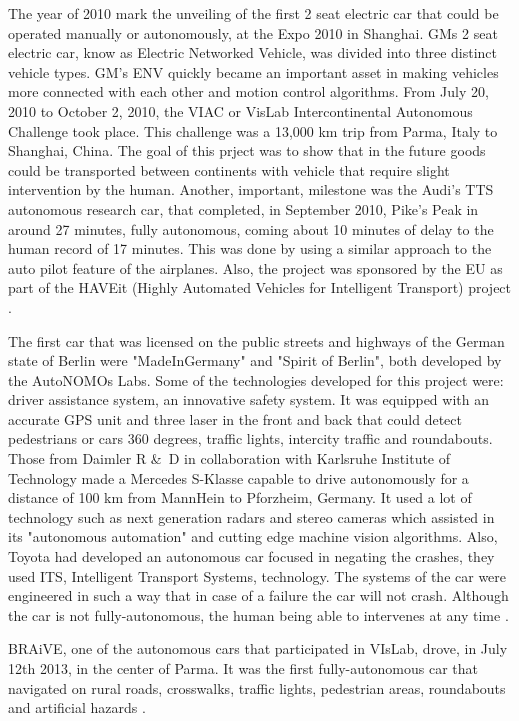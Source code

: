 The year of 2010 mark the unveiling of the first 2 seat electric car that could be operated manually or autonomously, at the Expo 2010 in Shanghai. GMs 2 seat electric car, know as Electric Networked Vehicle, was divided into three distinct vehicle types. GM's ENV quickly became an important asset in making vehicles more connected with each other and motion control algorithms. From July 20, 2010 to October 2, 2010, the VIAC or VisLab Intercontinental Autonomous Challenge took place. This challenge was a 13,000 km trip from Parma, Italy to Shanghai, China. The goal of this prject was to show that in the future goods could be transported between continents with vehicle that require slight intervention by the human. Another, important, milestone was the Audi's TTS autonomous research car, that completed, in September 2010, Pike's Peak in around 27 minutes, fully autonomous, coming about 10 minutes of delay to the human record of 17 minutes. This was done by using a similar approach to the auto pilot feature of the airplanes. Also, the project was sponsored by the EU as part of the HAVEit (Highly Automated Vehicles for Intelligent Transport) project \cite{AutoAI}. \par

The first car that was licensed on the public streets and highways of the German state of Berlin were "MadeInGermany" and "Spirit of Berlin", both developed by the AutoNOMOs Labs. Some of the technologies developed for this project were: driver assistance system, an innovative safety system. It was equipped with an accurate GPS unit and three laser in the front and back that could detect pedestrians or cars 360 degrees, traffic lights, intercity traffic and roundabouts. Those from Daimler R  \&\ D in collaboration with Karlsruhe Institute of Technology made a Mercedes S-Klasse capable to drive autonomously for a distance of 100 km from MannHein to Pforzheim, Germany. It used a lot of technology such as next generation radars and stereo cameras which assisted in its "autonomous automation" and cutting edge machine vision algorithms. Also, Toyota had developed an autonomous car focused in negating the crashes, they used ITS, Intelligent Transport Systems, technology. The systems of the car were engineered in such a way that in case of a failure the car will not crash. Although the car is not fully-autonomous, the human being able to intervenes at any time \cite{AutoAI}.  \par

BRAiVE, one of the autonomous cars that participated in VIsLab, drove, in July 12th 2013, in the center of Parma. It was the first fully-autonomous car that navigated on rural roads, crosswalks, traffic lights, pedestrian areas, roundabouts and artificial hazards \cite{AutoAI}. \par

